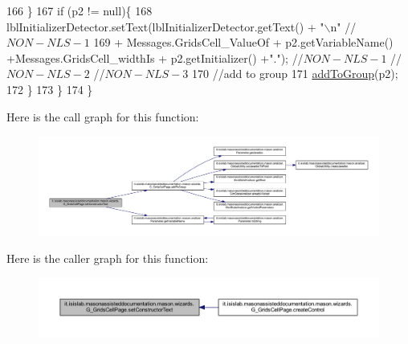 \begin{DoxyCode}
166             \}
167             \textcolor{keywordflow}{if} (p2 != null)\{    
168                 lblInitializerDetector.setText(lblInitializerDetector.getText() + \textcolor{stringliteral}{"\(\backslash\)n"} \textcolor{comment}{//$NON-NLS-1$}
169                     +  Messages.GridsCell\_ValueOf + p2.getVariableName() +Messages.GridsCell\_widthIs + 
      p2.getInitializer() +\textcolor{stringliteral}{"."}); \textcolor{comment}{//$NON-NLS-1$ //$NON-NLS-2$ //$NON-NLS-3$}
170                 \textcolor{comment}{//add to group}
171                 \hyperlink{classit_1_1isislab_1_1masonassisteddocumentation_1_1mason_1_1wizards_1_1_g___grids_cell_page_a874d5aab262342b54eb0bd9ea0e576ab}{addToGroup}(p2);
172             \}           
173         \}
174     \}
\end{DoxyCode}


Here is the call graph for this function\-:\nopagebreak
\begin{figure}[H]
\begin{center}
\leavevmode
\includegraphics[width=350pt]{classit_1_1isislab_1_1masonassisteddocumentation_1_1mason_1_1wizards_1_1_g___grids_cell_page_ad9069cbfc289b5549376270b2bc35c21_cgraph}
\end{center}
\end{figure}




Here is the caller graph for this function\-:\nopagebreak
\begin{figure}[H]
\begin{center}
\leavevmode
\includegraphics[width=350pt]{classit_1_1isislab_1_1masonassisteddocumentation_1_1mason_1_1wizards_1_1_g___grids_cell_page_ad9069cbfc289b5549376270b2bc35c21_icgraph}
\end{center}
\end{figure}




